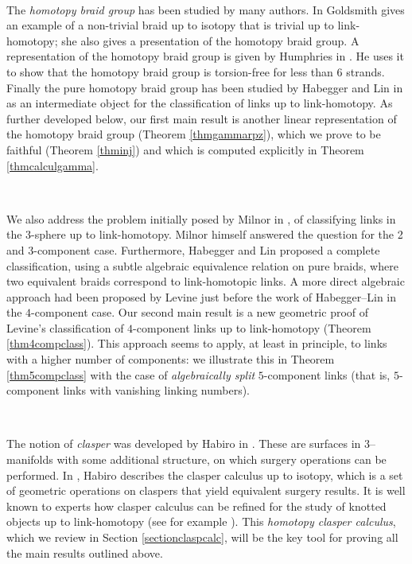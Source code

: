 \documentclass[11pt, a4paper, twoside,reqno]{amsart}
\begin{document}
\

The \emph{homotopy braid group} has been studied by many authors. In \cite{GoldsmithHomotopybraids} Goldsmith gives an example of a non-trivial braid up to isotopy that is trivial up to link-homotopy; she also gives a presentation of the homotopy braid group. A representation of the homotopy braid group is given by Humphries in \cite{HumphriesTorsion}. He uses it to show that the homotopy braid group is torsion-free for less than 6 strands. Finally the pure homotopy braid group has been studied by Habegger and Lin in \cite{HabeggerLinHomotopy} as an intermediate object for the classification of links up to link-homotopy. As further developed below, our first main result is another linear representation of the homotopy braid group (Theorem \ref{thmgammarpz}), which we prove to be faithful (Theorem \ref{thminj}) and which is computed explicitly in Theorem \ref{thmcalculgamma}.

\

We also address the problem initially posed by Milnor in \cite{MilnorLinkgrp}, of classifying links in the 3-sphere up to link-homotopy. Milnor himself answered the question for the 2 and 3-component case. Furthermore, Habegger and Lin \cite{HabeggerLinHomotopy} proposed a complete classification, using a subtle algebraic equivalence relation on pure braids, where two equivalent braids correspond to link-homotopic links. A more direct algebraic approach had been proposed by Levine \cite{Levine4comp} just before the work of Habegger--Lin in the $4$-component case. Our second main result is a new geometric proof of Levine’s classification of $4$-component links up to link-homotopy (Theorem \ref{thm4compclass}). 
This approach seems to apply, at least in principle, to links with a higher number of components:  we illustrate this in Theorem \ref{thm5compclass} with the case of \emph{algebraically split} $5$-component links (that is, $5$-component links with vanishing linking numbers).

\

The notion of \emph{clasper} was developed by Habiro in \cite{HabiroClasp}. These are surfaces in 3–manifolds with some additional structure, on which surgery operations can be performed. In \cite{HabiroClasp}, Habiro describes the clasper calculus up to isotopy, which is a set of geometric operations on claspers that yield equivalent surgery results. It is well known to experts how clasper  calculus  can  be  refined  for  the  study  of  knotted  objects  up  to  link-homotopy  (see  for  example  \cite{Flemingyasuselfck,YasuharaAkiraSelfdelteq}). This \emph{homotopy clasper calculus}, which we review in Section \ref{sectionclaspcalc}, will be the key tool for proving all the main results outlined above.
\end{document}
